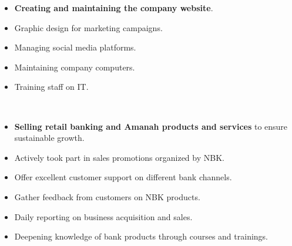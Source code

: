 \documentclass[theme]{cv_einstein}
\begin{document}
\begin{paracol}{2}
\begin{rightcolumn}
            {
                \begin{itemize}
                    \item \textbf{Creating and maintaining the company website}.
                    \item Graphic design for marketing campaigns.
                    \item Managing social media platforms.
                    \item Maintaining company computers.
                    \item Training staff on IT.
                \end{itemize}
            }
            \vspace{\itemspace}\\
            
            {
                \begin{itemize}
                    \item \textbf{Selling retail banking and Amanah products and services} to ensure sustainable growth.
                    \item Actively took part in sales promotions organized by NBK.
                    \item Offer excellent customer support on different bank channels.
                    \item Gather feedback from customers on NBK products.
                    \item Daily reporting on business acquisition and sales.
                    \item Deepening knowledge of bank products through courses and trainings.
                \end{itemize}
            }
            \vspace{\itemspace}\\
            

\end{rightcolumn}
\end{paracol}
\end{document}
